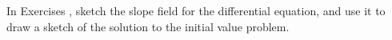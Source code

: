 {\noindent In Exercises}
{, sketch the slope field for the differential equation, and use it to draw a sketch of the solution to the initial value problem.}
